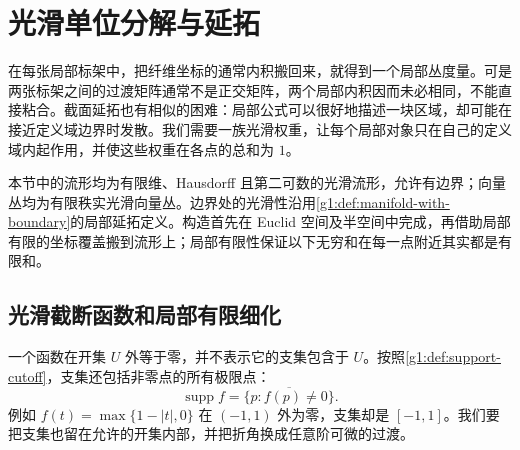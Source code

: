 
% 
% 

\section{光滑单位分解与延拓}
\label{g1:sec:1203}

在每张局部标架中，把纤维坐标的通常内积搬回来，就得到一个局部丛度量。可是两张标架之间的过渡矩阵通常不是正交矩阵，两个局部内积因而未必相同，不能直接粘合。截面延拓也有相似的困难：局部公式可以很好地描述一块区域，却可能在接近定义域边界时发散。我们需要一族光滑权重，让每个局部对象只在自己的定义域内起作用，并使这些权重在各点的总和为 \(1\)。

\ProseParagraphBreak

本节中的流形均为有限维、Hausdorff 且第二可数的光滑流形，允许有边界；向量丛均为有限秩实光滑向量丛。边界处的光滑性沿用\cref{g1:def:manifold-with-boundary}的局部延拓定义。构造首先在 Euclid 空间及半空间中完成，再借助局部有限的坐标覆盖搬到流形上；局部有限性保证以下无穷和在每一点附近其实都是有限和。

\subsection{光滑截断函数和局部有限细化}
\label{g1:subsec:1203:01}

一个函数在开集 \(U\) 外等于零，并不表示它的支集包含于 \(U\)。按照\cref{g1:def:support-cutoff}，支集还包括非零点的所有极限点：
\[
	\operatorname{supp}f=\overline{\{p:f(p)\ne0\}}.
\]
例如 \(f(t)=\max\{1-|t|,0\}\) 在 \((-1,1)\) 外为零，支集却是 \([-1,1]\)。我们要把支集也留在允许的开集内部，并把折角换成任意阶可微的过渡。

